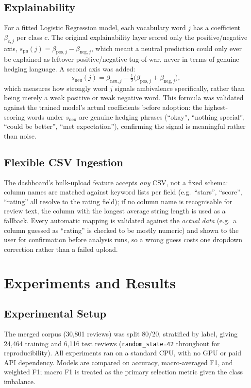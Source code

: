 \documentclass{article}
\begin{document}
\subsection{Explainability}
For a fitted Logistic Regression model, each vocabulary word $j$ has a
coefficient $\beta_{c,j}$ per class $c$. The original explainability layer
scored only the positive/negative axis,
$s_{\text{pn}}(j) = \beta_{\text{pos},j} - \beta_{\text{neg},j}$, which
meant a neutral prediction could only ever be explained as leftover
positive/negative tug-of-war, never in terms of genuine hedging language.
A second axis was added:
\begin{equation}
    s_{\text{neu}}(j) = \beta_{\text{neu},j} -
        \tfrac{1}{2}\big(\beta_{\text{pos},j} + \beta_{\text{neg},j}\big),
\end{equation}
which measures how strongly word $j$ signals ambivalence specifically,
rather than being merely a weak positive or weak negative word. This
formula was validated against the trained model's actual coefficients
before adoption: the highest-scoring words under $s_{\text{neu}}$ are
genuine hedging phrases (``okay'', ``nothing special'', ``could be
better'', ``met expectation''), confirming the signal is meaningful rather
than noise.

\subsection{Flexible CSV Ingestion}
The dashboard's bulk-upload feature accepts \emph{any} CSV, not a fixed
schema: column names are matched against keyword lists per field (e.g.\
``stars'', ``score'', ``rating'' all resolve to the rating field); if no
column name is recognisable for review text, the column with the longest
average string length is used as a fallback. Every automatic mapping is
validated against the \emph{actual data} (e.g.\ a column guessed as
``rating'' is checked to be mostly numeric) and shown to the user for
confirmation before analysis runs, so a wrong guess costs one dropdown
correction rather than a failed upload.

\section{Experiments and Results}

\subsection{Experimental Setup}
The merged corpus (30{,}801 reviews) was split 80/20, stratified by label,
giving 24{,}464 training and 6{,}116 test reviews (\texttt{random\_state=42}
throughout for reproducibility). All experiments ran on a standard CPU, with
no GPU or paid API dependency. Models are compared on accuracy,
macro-averaged F1, and weighted F1; macro F1 is treated as the primary
selection metric given the class imbalance.
\end{document}

